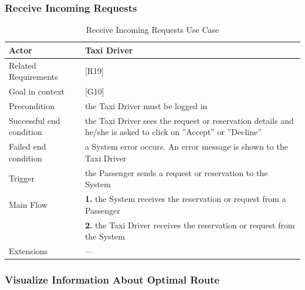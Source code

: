 \subsubsection{Receive Incoming Requests}

\begin{table}[htbp]
\begin{center}
\begin{tabular}[t]{p{}p{}}

\hline
Actor & Taxi Driver \\
\hline
Related Requirements & [R19] \\
\hline
Goal in context & [G10] \\
\hline
Precondition & the Taxi Driver must be logged in \\
\hline
Successful end condition & the Taxi Driver sees the request or reservation details and he/she is asked to click on ''Accept'' or ''Decline'' \\
\hline
Failed end condition & a System error occurs. An error message is shown to the Taxi Driver  \\
\hline
Trigger & the Passenger sends a request or reservation to the System \\
\hline
Main Flow & \textbf{1.} the System receives the reservation or request from a Passenger \\
& \textbf{2.} the Taxi Driver receives the reservation or request from the System \\
\hline
Extensions & --- \\
\hline

\end{tabular}
\end{center}
\caption{Receive Incoming Requests Use Case}
\end{table}
\clearpage

\subsubsection{Visualize Information About Optimal Route}


